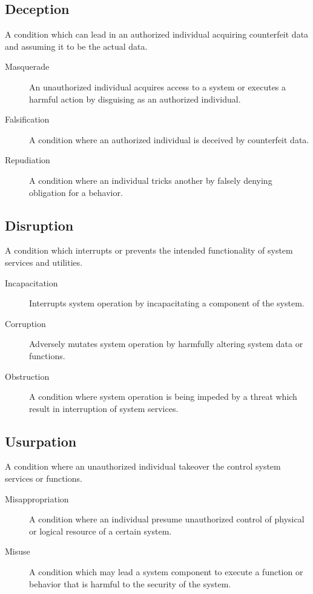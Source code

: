 \documentclass[../index.tex]{subfiles}
\begin{document}
\subsection{Deception}

A condition which can lead in an authorized individual acquiring counterfeit data and assuming it to be the actual data.

\begin{description}
	\item[Masquerade] An unauthorized individual acquires access to a system or executes a harmful
		action by disguising as an authorized individual.
	\item[Falsification] A condition where an authorized individual is deceived by counterfeit data.
	\item[Repudiation] A condition where an individual tricks another by falsely denying obligation
		for a behavior.
\end{description}

\subsection{Disruption}

A condition which interrupts or prevents the intended functionality of system services and utilities.

\begin{description}
	\item[Incapacitation] Interrupts system operation by incapacitating a component of the system.
	\item[Corruption] Adversely mutates system operation by harmfully altering system data or functions.
	\item[Obstruction] A condition where system operation is being impeded by a threat which result in
		interruption of system services.
\end{description}

\subsection{Usurpation}

A condition where an unauthorized individual takeover the control system services or functions.

\begin{description}
	\item[Misappropriation] A condition where an individual presume unauthorized control of physical
		or logical resource of a certain system.
	\item[Misuse] A condition which may lead a system component to execute a function or behavior that
		is harmful to the security of the system.
\end{description}
\end{document}
